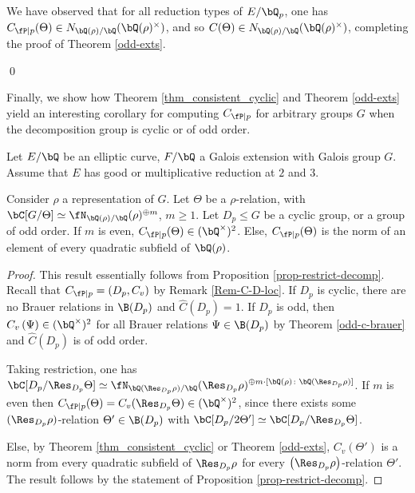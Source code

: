 We have observed that for all reduction types of $E / \bQ_p$, one has $C_{\fP \mid p} (\Theta) \in \fieldnorm{\rho}$, and so $C(\Theta) \in \fieldnorm{\rho}$, completing the proof of Theorem \ref{odd-exts}.

\qed

Finally, we show how Theorem \ref{thm_consistent_cyclic} and Theorem \ref{odd-exts} yield an interesting corollary for computing $C_{\fP \mid p}$ for arbitrary groups $G$ when the decomposition group is cyclic or of odd order.

\begin{cor}\label{cor-odd-cyclic-decomp}
    Let $E / \bQ$ be an elliptic curve, $F / \bQ$ a Galois extension with Galois group $G$. Assume that $E$ has good or multiplicative reduction at $2$ and $3$. 
    
    Consider $\rho$ a representation of $G$. Let $\Theta$ be a $\rho$-relation, with $\bC[G / \Theta] \simeq \repnorm{\rho}^{\oplus m}$, $ m \geq 1$. Let $D_p \leq G$ be a cyclic group, or a group of odd order. 
    If $m$ is even, $C_{\fP \mid p}(\Theta) \in (\bQ^{\times})^2$. Else, $C_{\fP \mid p}(\Theta)$ is the norm of an element of every quadratic subfield of $\bQ(\rho)$. 
    \end{cor}

\begin{proof}
    This result essentially follows from Proposition \ref{prop-restrict-decomp}. Recall that $C_{\fP \mid p} = (D_p, C_v)$ by Remark \ref{Rem-C-D-loc}. If $D_p$ is cyclic, there are no Brauer relations in $\B(D_p)$ and $\hat{C}(D_p) = 1$. If $D_p$ is odd, then $C_v\left(\Psi\right) \in (\bQ^{\times})^2$ for all Brauer relations $\Psi \in \B(D_p)$ by Theorem \ref{odd-c-brauer} and $\hat{C}(D_p)$ is of odd order.

    Taking restriction, one has $\bC[D_p / \Res_{D_{p}} \Theta] \simeq \repnorm{\Res_{D_p} \rho}^{\oplus m \cdot [\bQ(\rho) \colon \bQ(\Res_{D_p} \rho)]}$. If $m$ is even then $C_{\fP \mid p}(\Theta) = C_v(\Res_{D_p} \Theta) \in (\bQ^{\times})^2$, since there exists some $(\Res_{D_p} \rho)$-relation $\Theta' \in \B(D_p)$ with $\bC[D_p / 2 \Theta'] \simeq \bC[D_p / \Res_{D_p} \Theta]$. 

    Else, by Theorem \ref{thm_consistent_cyclic} or Theorem \ref{odd-exts}, $C_v(\Theta')$ is a norm from every quadratic subfield of $\Res_{D_p} \rho$ for every $\left(\Res_{D_p} \rho\right)$-relation $\Theta'$. The result follows by the statement of Proposition \ref{prop-restrict-decomp}. 
\end{proof}
